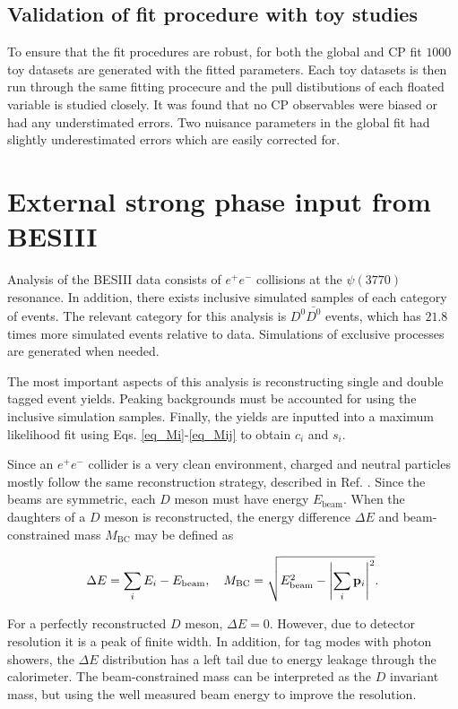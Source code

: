 \documentclass[12pt, a4paper, notitlepage, onecolumn]{article}
\numberwithin{equation}{section}
\begin{document}
\subsection{Validation of fit procedure with toy studies}
\noindent To ensure that the fit procedures are robust, for both the global and CP fit $1000$ toy datasets are generated with the fitted parameters. Each toy datasets is then run through the same fitting procecure and the pull distibutions of each floated variable is studied closely. It was found that no CP observables were biased or had any understimated errors. Two nuisance parameters in the global fit had slightly underestimated errors which are easily corrected for.

\section{External strong phase input from BESIII}
\noindent Analysis of the BESIII data consists of $e^+e^-$ collisions at the $\psi(3770)$ resonance. In addition, there exists inclusive simulated samples of each category of events. The relevant category for this analysis is $D^0\bar{D^0}$ events, which has $21.8$ times more simulated events relative to data. Simulations of exclusive processes are generated when needed.

The most important aspects of this analysis is reconstructing single and double tagged event yields. Peaking backgrounds must be accounted for using the inclusive simulation samples. Finally, the yields are inputted into a maximum likelihood fit using Eqs. \eqref{eq_Mi}-\eqref{eq_Mij} to obtain $c_i$ and $s_i$.

Since an $e^+e^-$ collider is a very clean environment, charged and neutral particles mostly follow the same reconstruction strategy, described in Ref. \cite{cite_KSKKAnalysis}. Since the beams are symmetric, each $D$ meson must have energy $E_\text{beam}$. When the daughters of a $D$ meson is reconstructed, the energy difference $\Delta E$ and beam-constrained mass $M_\text{BC}$ may be defined as

\begin{equation*}
  \Delta E = \sum_i E_i - E_\text{beam}, \quad M_\text{BC} = \sqrt{E_\text{beam}^2 - \abs{\sum_i\vb{p}_i}^2}.
\end{equation*}

For a perfectly reconstructed $D$ meson, $\Delta E = 0$. However, due to detector resolution it is a peak of finite width. In addition, for tag modes with photon showers, the $\Delta E$ distribution has a left tail due to energy leakage through the calorimeter. The beam-constrained mass can be interpreted as the $D$ invariant mass, but using the well measured beam energy to improve the resolution.
\end{document}
